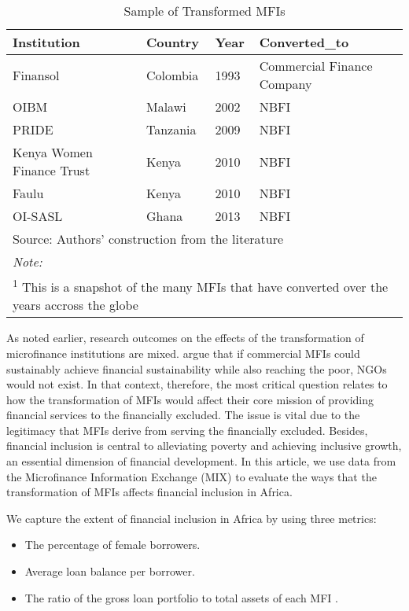 \documentclass[a4paper,nobind]{templates/ociamthesis}
\providecommand{\tightlist}{%
  \setlength{\itemsep}{0pt}\setlength{\parskip}{0pt}}
\begin{document}
\begin{table}

\caption{\label{tab:unnamed-chunk-2}Sample of Transformed MFIs}
\centering
\fontsize{10}{12}\selectfont
\begin{tabular}[t]{llll}
\toprule
Institution & Country & Year & Converted\_to\\
\midrule
Finansol & Colombia & 1993 & Commercial Finance Company\\
OIBM & Malawi & 2002 & NBFI\\
PRIDE & Tanzania & 2009 & NBFI\\
Kenya Women Finance Trust & Kenya & 2010 & NBFI\\
Faulu & Kenya & 2010 & NBFI\\
\addlinespace
OI-SASL & Ghana & 2013 & NBFI\\
\bottomrule
\multicolumn{4}{l}{\rule{0pt}{1em}Source: Authors' construction from the literature}\\
\multicolumn{4}{l}{\rule{0pt}{1em}\textit{Note: }}\\
\multicolumn{4}{l}{\rule{0pt}{1em}\textsuperscript{1} This is a snapshot of the many MFIs that have converted over the years accross the globe}\\
\end{tabular}
\end{table}

As noted earlier, research outcomes on the effects of the transformation of microfinance institutions are mixed. \textcite{morduch2019challenges} argue that if commercial MFIs could sustainably achieve financial sustainability while also reaching the poor, NGOs would not exist. In that context, therefore, the most critical question relates to how the transformation of MFIs would affect their core mission of providing financial services to the financially excluded. The issue is vital due to the legitimacy that MFIs derive from serving the financially excluded. Besides, financial inclusion is central to alleviating poverty and achieving inclusive growth, an essential dimension of financial development. In this article, we use data from the Microfinance Information Exchange (MIX) to evaluate the ways that the transformation of MFIs affects financial inclusion in Africa.

We capture the extent of financial inclusion in Africa by using three metrics:

\begin{itemize}
\tightlist
\item
  The percentage of female borrowers.
\item
  Average loan balance per borrower.
\item
  The ratio of the gross loan portfolio to total assets of each MFI \autocite{d2017ngos}.
\end{itemize}
\end{document}
